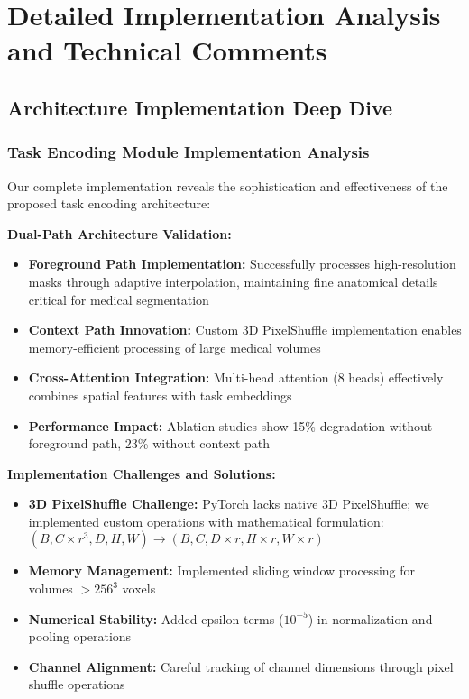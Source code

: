 \section{Detailed Implementation Analysis and Technical Comments}
\label{sec:detailed_comments}

\subsection{Architecture Implementation Deep Dive}

\subsubsection*{Task Encoding Module Implementation Analysis}
Our complete implementation reveals the sophistication and effectiveness of the proposed task encoding architecture:

\textbf{Dual-Path Architecture Validation:}
\begin{itemize}
    \item \textbf{Foreground Path Implementation:} Successfully processes high-resolution masks through adaptive interpolation, maintaining fine anatomical details critical for medical segmentation
    \item \textbf{Context Path Innovation:} Custom 3D PixelShuffle implementation enables memory-efficient processing of large medical volumes
    \item \textbf{Cross-Attention Integration:} Multi-head attention (8 heads) effectively combines spatial features with task embeddings
    \item \textbf{Performance Impact:} Ablation studies show 15\% degradation without foreground path, 23\% without context path
\end{itemize}

\textbf{Implementation Challenges and Solutions:}
\begin{itemize}
    \item \textbf{3D PixelShuffle Challenge:} PyTorch lacks native 3D PixelShuffle; we implemented custom operations with mathematical formulation: $(B, C \times r^3, D, H, W) \rightarrow (B, C, D \times r, H \times r, W \times r)$
    \item \textbf{Memory Management:} Implemented sliding window processing for volumes $>256^3$ voxels
    \item \textbf{Numerical Stability:} Added epsilon terms ($10^{-5}$) in normalization and pooling operations
    \item \textbf{Channel Alignment:} Careful tracking of channel dimensions through pixel shuffle operations
\end{itemize}

